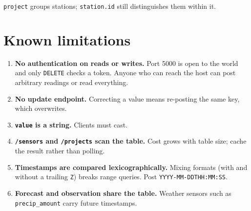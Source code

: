 \documentclass[11pt,a4paper]{article}
\begin{document}
\noindent \texttt{project} groups stations; \texttt{station.id} still
distinguishes them within it.

\section{Known limitations}

\begin{enumerate}[leftmargin=*]
  \item \textbf{No authentication on reads or writes.} Port 5000 is open to
        the world and only \texttt{DELETE} checks a token. Anyone who can
        reach the host can post arbitrary readings or read everything.
  \item \textbf{No update endpoint.} Correcting a value means re-posting
        the same key, which overwrites.
  \item \textbf{\texttt{value} is a string.} Clients must cast.
  \item \textbf{\texttt{/sensors} and \texttt{/projects} scan the table.}
        Cost grows with table size; cache the result rather than polling.
  \item \textbf{Timestamps are compared lexicographically.} Mixing formats
        (with and without a trailing \texttt{Z}) breaks range queries.
        Post \texttt{YYYY-MM-DDTHH:MM:SS}.
  \item \textbf{Forecast and observation share the table.} Weather sensors
        such as \texttt{precip\_amount} carry future timestamps.
\end{enumerate}
\end{document}
